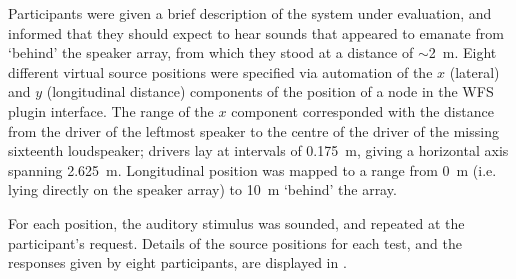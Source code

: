 Participants were given a brief description of the system under evaluation,
and informed that they should expect to hear sounds that appeared to emanate
from `behind' the speaker array, from which they stood at a distance of
$\sim$\qty{2}{\m}.
Eight different virtual source positions were specified via automation of the
$x$ (lateral) and $y$ (longitudinal distance) components of the position of a
node in the WFS plugin interface.
The range of the $x$ component corresponded with the distance from the driver
of the leftmost speaker to the centre of the driver of the missing sixteenth
loudspeaker; drivers lay at intervals of \qty{.175}{\m}, giving a horizontal
axis spanning \qty{2.625}{\m}.
Longitudinal position was mapped to a range from \qty{0}{\m} (i.e. lying
directly on the speaker array) to \qty{10}{\m} `behind' the array.

For each position, the auditory stimulus was sounded, and repeated at the
participant's request.
Details of the source positions for each test, and the responses given by
eight participants, are displayed in .

